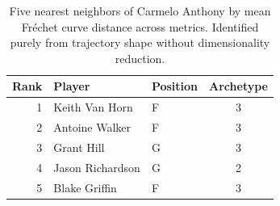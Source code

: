 \begin{table}[htbp]
  \centering\small
  \begin{tabular}{rllc}
    \toprule
    Rank & Player & Position & Archetype \\
    \midrule
    1 & Keith Van Horn & F & 3 \\
    2 & Antoine Walker & F & 3 \\
    3 & Grant Hill & G & 3 \\
    4 & Jason Richardson & G & 2 \\
    5 & Blake Griffin & F & 3 \\
    \bottomrule
  \end{tabular}
  \caption{Five nearest neighbors of Carmelo Anthony by mean Fr\'{e}chet curve distance across metrics. Identified purely from trajectory shape without dimensionality reduction.}
  \label{tab:Carmelo_Anthony_frechet_curve_neighbors}
\end{table}

